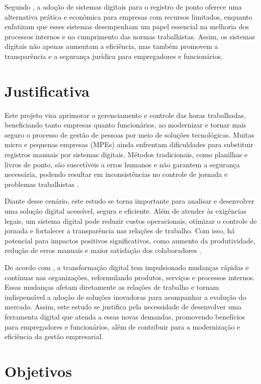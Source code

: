 Segundo \textcite{gomes2023}, a adoção de sistemas digitais para o registro de ponto oferece uma alternativa prática e econômica para empresas com recursos limitados, enquanto \textcite{mariotti2011} enfatizam que esses sistemas desempenham um papel essencial na melhoria dos processos internos e no cumprimento das normas trabalhistas. Assim, os sistemas digitais não apenas aumentam a eficiência, mas também promovem a transparência e a segurança jurídica para empregadores e funcionários.

\section{Justificativa}
Este projeto visa aprimorar o gerenciamento e controle das horas trabalhadas, beneficiando tanto empresas quanto funcionários, ao modernizar e tornar mais seguro o processo de gestão de pessoas por meio de soluções tecnológicas. Muitas micro e pequenas empresas (MPEs) ainda enfrentam dificuldades para substituir registros manuais por sistemas digitais. Métodos tradicionais, como planilhas e livros de ponto, são suscetíveis a erros humanos e não garantem a segurança necessária, podendo resultar em inconsistências no controle de jornada e problemas trabalhistas \cite{FlorindoBianchi2022}. 

Diante desse cenário, este estudo se torna importante para analisar e desenvolver uma solução digital acessível, segura e eficiente. Além de atender às exigências legais, um sistema digital pode reduzir custos operacionais, otimizar o controle de jornada e fortalecer a transparência nas relações de trabalho. Com isso, há potencial para impactos positivos significativos, como aumento da produtividade, redução de erros manuais e maior satisfação dos colaboradores \cite{gomes2023}.

De acordo com \textcite{Longo2019}, a transformação digital tem impulsionado mudanças rápidas e contínuas nas organizações, reformulando produtos, serviços e processos internos. Essas mudanças afetam diretamente as relações de trabalho e tornam indispensável a adoção de soluções inovadoras para acompanhar a evolução do mercado. Assim, este estudo se justifica pela necessidade de desenvolver uma ferramenta digital que atenda a essas novas demandas, promovendo benefícios para empregadores e funcionários, além de contribuir para a modernização e eficiência da gestão empresarial.


\section{Objetivos}

